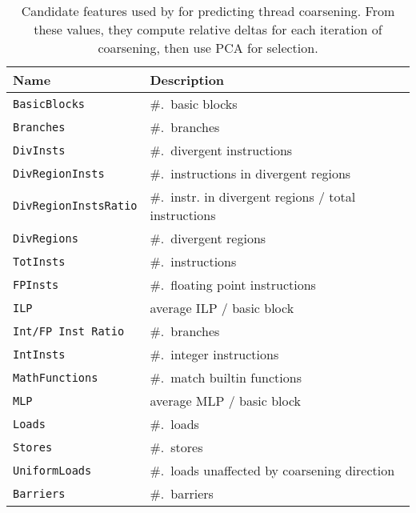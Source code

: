 \begin{table}
  \centering%
    \begin{tabular}{| l l |}
      \hline
      \rowcolor{gray!50}
      \textbf{Name} & \textbf{Description} \\
      \hline
      \texttt{BasicBlocks} & \#.\ basic blocks \\
      \texttt{Branches} & \#.\ branches \\
      \texttt{DivInsts} & \#.\ divergent instructions \\
      \texttt{DivRegionInsts} & \#.\ instructions in divergent regions \\
      \texttt{DivRegionInstsRatio} & \#.\ instr. in divergent regions / total instructions \\
      \texttt{DivRegions} & \#.\ divergent regions \\
      \texttt{TotInsts} & \#.\ instructions \\
      \texttt{FPInsts} & \#.\ floating point instructions \\
      \texttt{ILP} & average ILP / basic block \\
      \texttt{Int/FP Inst Ratio} & \#.\ branches \\
      \texttt{IntInsts} & \#.\ integer instructions \\
      \texttt{MathFunctions} & \#.\ match builtin functions \\
      \texttt{MLP} & average MLP / basic block \\
      \texttt{Loads} & \#.\ loads \\
      \texttt{Stores} & \#.\ stores \\
      \texttt{UniformLoads} & \#.\ loads unaffected by coarsening direction \\
      \texttt{Barriers} & \#.\ barriers \\
      \hline
    \end{tabular}%
    \label{tab:features-pact14-raw}%
  \caption[\citeauthor{Magni2014} features for predicting thread coarsening]{%
    Candidate features used by \citeauthor{Magni2014} for predicting thread
    coarsening. From these values, they compute relative deltas for each
    iteration of coarsening, then use PCA for selection.%
  }%
  \label{tab:magni-features} %
\end{table}
